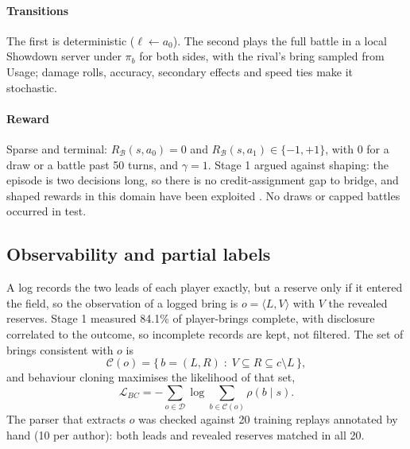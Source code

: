 \documentclass[conference]{IEEEtran}
\begin{document}
\paragraph{Transitions} The first is deterministic ($\ell \leftarrow a_0$). The second plays the full battle in
a local Showdown server under $\pi_b$ for both sides, with the rival's bring sampled from Usage; damage rolls,
accuracy, secondary effects and speed ties make it stochastic.

\paragraph{Reward} Sparse and terminal: $R_{\mathcal{B}}(s,a_0)=0$ and $R_{\mathcal{B}}(s,a_1) \in \{-1,+1\}$,
with $0$ for a draw or a battle past 50 turns, and $\gamma=1$. Stage 1 argued against shaping: the episode is
two decisions long, so there is no credit-assignment gap to bridge, and shaped rewards in this domain have been
exploited \cite{reis2025,karten2026}. No draws or capped battles occurred in test.

\subsection{Observability and partial labels}
A log records the two leads of each player exactly, but a reserve only if it entered the field, so the
observation of a logged bring is $o = \langle L, V \rangle$ with $V$ the revealed reserves. Stage 1 measured
84.1\% of player-brings complete, with disclosure correlated to the outcome, so incomplete records are kept,
not filtered. The set of brings consistent with $o$ is
\begin{equation}
\mathcal{C}(o) = \{\, b = (L, R) \;:\; V \subseteq R \subseteq c \setminus L \,\} ,
\label{eq:consistent}
\end{equation}
and behaviour cloning maximises the likelihood of that set,
\begin{equation}
\mathcal{L}_{BC} = -\sum_{o \in \mathcal{D}} \log \sum_{b \in \mathcal{C}(o)} \rho(b \mid s) .
\label{eq:partial}
\end{equation}
The parser that extracts $o$ was checked against 20 training replays annotated by hand (10 per author): both
leads and revealed reserves matched in all 20.
\end{document}
